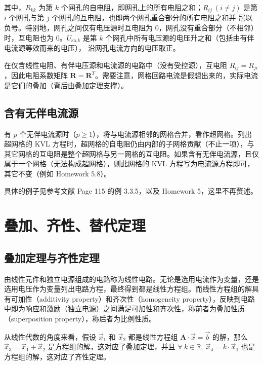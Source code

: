 \documentclass[UTF8]{report}
\def\R{\mathbb{R}}
\theoremstyle{MyLineTheoremStyle} %
\theoremstyle{MyBlockTheoremStyle} %
\theoremstyle{MySubsubsectionStyle} %
\begin{document}
其中，$R_{kk}$ 为第 $k$ 个网孔的自电阻，即网孔上的所有电阻之和；$R_{ij}\ (i\ne j)$ 是第 $i$ 个网孔与第 $j$ 个网孔的互电阻，也即两个网孔重合部分的所有电阻之和并 {\color{red} 冠以负号}。特别地，网孔之间仅有电压源时互电阻为 0，网孔没有重合部分（不相邻）时，互电阻也为 0。$U_{\text{sn,} k}$ 是第 $k$ 个网孔中所有电压源的电压升之和（包括由有伴电流源等效而来的电压），{\color{red} 沿网孔电流方向的电压取正}。

在仅含线性电阻、有伴电压源和电流源的电路中（没有受控源），互电阻 $R_{ij} = R_{ji}$，因此电阻系数矩阵 $\boldsymbol{R} = \boldsymbol{R}^T$。需要注意，网格回路电流是假想出来的，实际电流是它们的叠加（背后由叠加定理支撑）。

\subsection{含有无伴电流源}

有 $p$ 个无伴电流源时（$p \geqslant 1$），将与电流源相邻的网格合并，看作超网格。列出超网格的 KVL 方程时，超网格的自电阻仍由内部的子网格贡献（不止一项），与其它网格的互电阻是整个超网格与另一网格的互电阻。如果含有无伴电流源，且仅属于一个网格（无法构成超网格），则此网格的 KVL 方程写为电流源方程即可，其它不变（例如 Homework 5.8）。

具体的例子见参考文献 \cite{电路原理} Page 115 的例 3.3.5，以及 Homework 5，这里不再赘述。



\section{叠加、齐性、替代定理}

\subsection{叠加定理与齐性定理}

由线性元件和独立电源组成的电路称为线性电路。无论是选用电流作为变量，还是选用电压作为变量列出电路方程，最终得到都是线性方程组。而线性方程组的解具有可加性（additivity property）和齐次性（homogeneity property），反映到电路中即为响应和激励（独立电源）之间满足可加性和齐次性，称前者为叠加性质（superposition property），称后者为比例性质。

从线性代数的角度来看，假设 $\vec{x}_1$ 和 $\vec{x}_2$ 都是线性方程组 $\boldsymbol{A} \cdot \vec{x} = \vec{b}$ 的解，那么 $\vec{x}_3 = \vec{x}_1 + \vec{x}_2$ 是方程组的解，这对应了叠加定理，并且 $\forall\ k \in \R,\ \vec{x}_4 = k\cdot \vec{x}_1$ 也是方程组的解，这对应了齐性定理。
\end{document}
